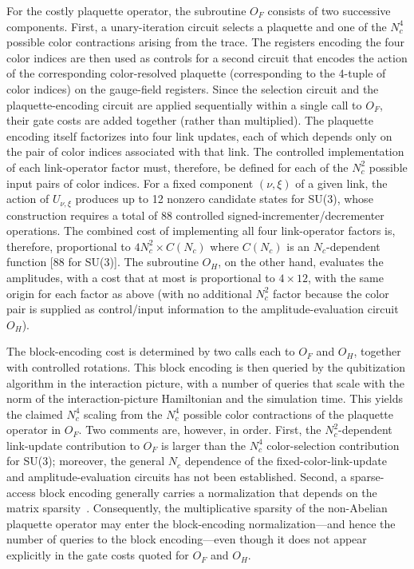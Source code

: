 \documentclass[aps,prd,twocolumn,showpacs,groupedaddress,superscriptaddress,nofootinbib,floatfix,preprintnumbers,longbibliography]{revtex4-1}
\begin{document}
For the costly plaquette operator, the subroutine $O_F$ consists of two successive components. First, a unary-iteration circuit selects a plaquette and one of the $N_c^4$ possible color contractions arising from the trace. The registers encoding the four color indices are then used as controls for a second circuit that encodes the action of the corresponding color-resolved plaquette (corresponding to the 4-tuple of color indices) on the gauge-field registers. Since the selection circuit and the plaquette-encoding circuit are applied sequentially within a single call to $O_F$, their gate costs are added together (rather than multiplied). The plaquette encoding itself factorizes into four link updates, each of which depends only on the pair of color indices associated with that link.
The controlled implementation of each link-operator factor must, therefore, be defined for each of the $N_c^2$ possible input pairs of color indices. For a fixed component $(\nu,\xi)$ of a given link, the action of $U_{\nu,\xi}$ produces up to 12 nonzero candidate states for SU(3), whose construction requires a total of 88 controlled signed-incrementer/decrementer operations. The combined cost of implementing all four link-operator factors is, therefore, proportional to $4N_c^2 \times C(N_c)$ where $C(N_c)$ is an $N_c$-dependent function [88 for SU(3)]. The subroutine $O_H$, on the other hand, evaluates the amplitudes, with a cost that at most is proportional to $4 \times 12$, with the same origin for each factor as above (with no additional $N_c^2$ factor because the color pair is supplied as control/input information to the amplitude-evaluation circuit $O_H$).

The block-encoding cost is determined by two calls each to $O_F$ and $O_H$, together with controlled rotations. This block encoding is then queried by the qubitization algorithm in the interaction picture, with a number of queries that scale with the norm of the interaction-picture Hamiltonian and the simulation time. This yields the claimed $N_c^4$ scaling from the $N_c^4$ possible color contractions of the plaquette operator in $O_F$. Two comments are, however, in order. First, the $N_c^2$-dependent link-update contribution to $O_F$ is larger than the $N_c^4$ color-selection contribution for SU(3); moreover, the general $N_c$ dependence of the fixed-color-link-update and amplitude-evaluation circuits has not been established. Second, a sparse-access block encoding generally carries a normalization that depends on the matrix sparsity~\cite{gilyen2019quantum}. Consequently, the multiplicative sparsity of the non-Abelian plaquette operator may enter the block-encoding normalization---and hence the number of queries to the block encoding---even though it does not appear explicitly in the gate costs quoted for $O_F$ and $O_H$.
\end{document}
